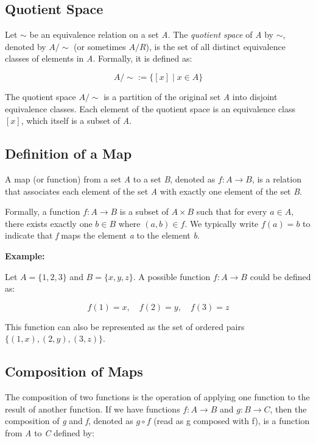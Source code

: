 \subsection{Quotient Space}

Let \(\sim\) be an equivalence relation on a set \emph{A}. The \emph{quotient space} of \emph{A} by 
\(\sim\), denoted by \(A/\sim\) (or sometimes \(A/R\)), is the set of all distinct equivalence classes of 
elements in \emph{A}. Formally, it is defined as:

\[
	A/\sim := \{[x] \mid x \in A\}
\]

The quotient space \(A/\sim\) is a partition of the original set \emph{A} into disjoint equivalence classes. 
Each element of the quotient space is an equivalence class \([x]\), which itself is a subset of \emph{A}.

\subsection{Definition of a Map}

A map (or function) from a set \emph{A} to a set \emph{B}, denoted as \(f: A \to B\), is a relation that 
associates each element of the set \emph{A} with exactly one element of the set \emph{B}.

Formally, a function \(f: A \to B\) is a subset of \(A \times B\) such that for every \(a \in A\), there 
exists exactly one \(b \in B\) where \((a,b) \in f\). We typically write \(f(a) = b\) to indicate that 
\emph{f} maps the element \emph{a} to the element \emph{b}.
\vspace{\baselineskip}

\textbf{Example:}
\vspace{\baselineskip}

Let \(A = \{1, 2, 3\}\) and \(B = \{x, y, z\}\). A possible function \(f: A \to B\) could be defined as:

\[
	f(1) = x, \quad f(2) = y, \quad f(3) = z
\]

This function can also be represented as the set of ordered pairs \(\{(1,x), (2,y), (3,z)\}\).

\subsection{Composition of Maps}

The composition of two functions is the operation of applying one function to the result of another 
function. If we have functions \(f: A \to B\) and \(g: B \rightarrow C\), then the composition of \emph{g} 
and \emph{f}, denoted as \(g \circ f\) (read as g composed with f), is a function from \emph{A} to \emph{C} defined 
by:

